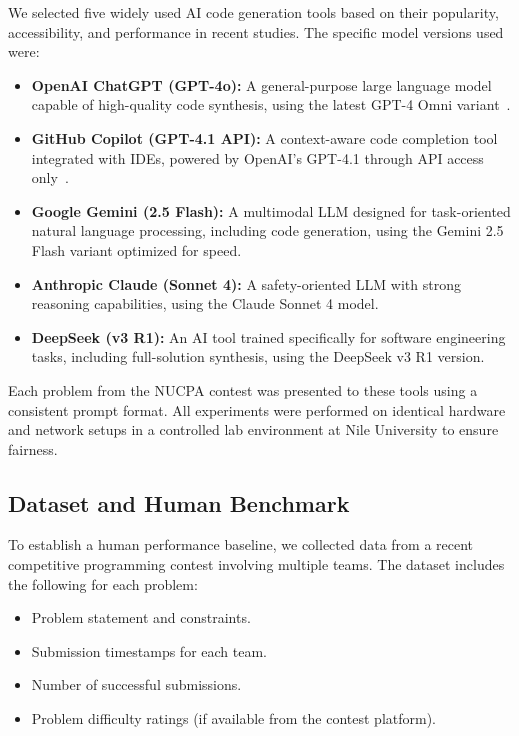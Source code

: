 \documentclass[conference]{IEEEtran}
\begin{document}
We selected five widely used AI code generation tools based on their popularity, accessibility, and performance in recent studies. The specific model versions used were:

\begin{itemize}
    \item \textbf{OpenAI ChatGPT (GPT-4o):} A general-purpose large language model capable of high-quality code synthesis, using the latest GPT-4 Omni variant~\cite{openai2023}.
    \item \textbf{GitHub Copilot (GPT-4.1 API):} A context-aware code completion tool integrated with IDEs, powered by OpenAI's GPT-4.1 through API access only~\cite{github2024}.
    \item \textbf{Google Gemini (2.5 Flash):} A multimodal LLM designed for task-oriented natural language processing, including code generation, using the Gemini 2.5 Flash variant optimized for speed.
    \item \textbf{Anthropic Claude (Sonnet 4):} A safety-oriented LLM with strong reasoning capabilities, using the Claude Sonnet 4 model.
    \item \textbf{DeepSeek (v3 R1):} An AI tool trained specifically for software engineering tasks, including full-solution synthesis, using the DeepSeek v3 R1 version.
\end{itemize}

Each problem from the NUCPA contest was presented to these tools using a consistent prompt format. All experiments were performed on identical hardware and network setups in a controlled lab environment at Nile University to ensure fairness.

\subsection{Dataset and Human Benchmark}

To establish a human performance baseline, we collected data from a recent competitive programming contest involving multiple teams. The dataset includes the following for each problem:
\begin{itemize}
    \item Problem statement and constraints.
    \item Submission timestamps for each team.
    \item Number of successful submissions.
    \item Problem difficulty ratings (if available from the contest platform).
\end{itemize}
\end{document}
